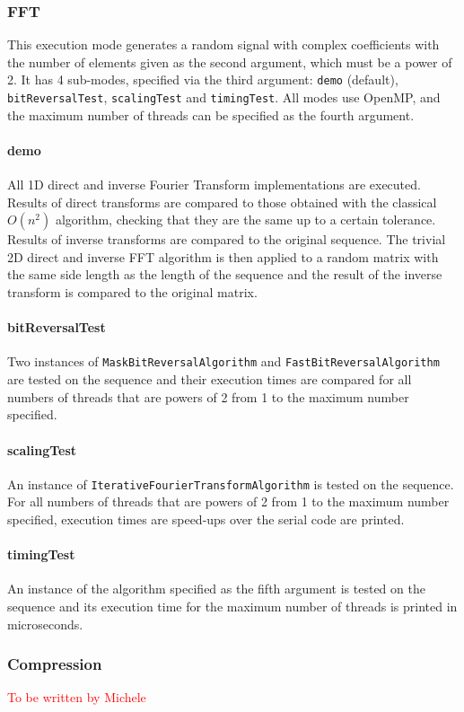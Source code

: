 \subsubsection{FFT}
This execution mode generates a random signal with complex coefficients with the number of elements given as the second argument, which must be a power of 2. It has 4 sub-modes, specified via the third argument: \texttt{demo} (default), \texttt{bitReversalTest}, \texttt{scalingTest} and \texttt{timingTest}. All modes use OpenMP, and the maximum number of threads can be specified as the fourth argument.
\paragraph{demo} All 1D direct and inverse Fourier Transform implementations are executed. Results of direct transforms are compared to those obtained with the classical $O(n^2)$ algorithm, checking that they are the same up to a certain tolerance. Results of inverse transforms are compared to the original sequence. The trivial 2D direct and inverse FFT algorithm is then applied to a random matrix with the same side length as the length of the sequence and the result of the inverse transform is compared to the original matrix.
\paragraph{bitReversalTest} Two instances of \texttt{Mask\-Bit\-Reversal\-Algorithm} and \texttt{Fast\-Bit\-Reversal\-Algorithm} are tested on the sequence and their execution times are compared for all numbers of threads that are powers of 2 from 1 to the maximum number specified.
\paragraph{scalingTest} An instance of \texttt{Iterative\-Fourier\-Transform\-Algorithm} is tested on the sequence. For all numbers of threads that are powers of 2 from 1 to the maximum number specified, execution times are speed-ups over the serial code are printed.
\paragraph{timingTest} An instance of the algorithm specified as the fifth argument is tested on the sequence and its execution time for the maximum number of threads is printed in microseconds.

\subsubsection{Compression}
\textcolor{red}{To be written by Michele}

